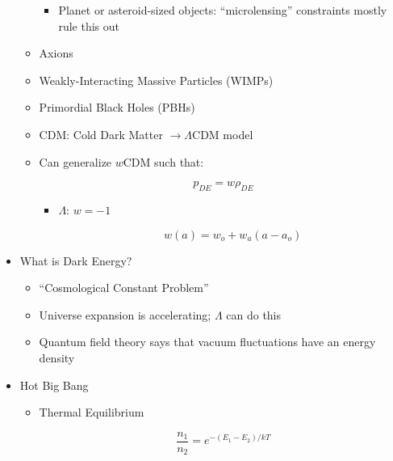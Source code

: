 \begin{itemize}
\begin{itemize}
\begin{itemize}
          \item Planet or asteroid-sized objects: ``microlensing'' constraints mostly rule this out

        \end{itemize}

      \item Axions

      \item Weakly-Interacting Massive Particles (WIMPs)

      \item Primordial Black Holes (PBHs)

      \item CDM: Cold Dark Matter $\to \Lambda$CDM model

      \item Can generalize $w$CDM such that:

        $$p_{DE}=w\rho_{DE}$$

        \begin{itemize}

          \item $\Lambda$: $w=-1$

            $$w(a)=w_o+w_a(a-a_o)$$

        \end{itemize}

    \end{itemize}

  \item What is Dark Energy?

    \begin{itemize}

      \item ``Cosmological Constant Problem''

      \item Universe expansion is accelerating; $\Lambda$ can do this

      \item Quantum field theory says that vacuum fluctuations have an energy density

    \end{itemize}

  \item Hot Big Bang

    \begin{itemize}

      \item Thermal Equilibrium

        $$\frac{n_1}{n_2}=e^{-(E_1-E_2)/kT}$$


\end{itemize}
\end{itemize}
